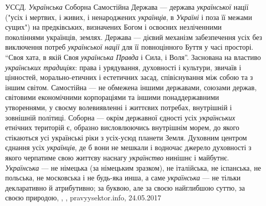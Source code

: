 УССД. \emph{Українська} Соборна Самостійна Держава — держава \emph{української} нації ("усіх
і мертвих, і живих, і ненароджених \emph{українців}, в \emph{Україні} і поза її межами
сущих") на предківських, визначених Богом і освоєних незліченними поколіннями
українців, землях.  Держава — дієвий механізм забезпечення усіх без виключення
потреб \emph{української нації} для її повноцінного Буття у часі просторі. \enquote{Своя хата,
в якій Своя \emph{українська Правда} і Сила, і Воля}. Заснована на властиво
\emph{українських традиціях}: права і урядування, духовності і культури, звичаїв і
цінностей, морально-етичних і естетичних засад, співіснування між собою та з
іншим світом.  Самостійна — не обмежена іншими державами, союзами держав,
світовими економічними корпораціями та іншими понаддержавними утвореннями, у
своєму волевиявленні і життєвих потребах, внутрішній і зовнішній політиці.
Соборна — окрім державної єдності усіх \emph{українських} етнічних територій є,
образно висловлюючись внутрішнім морем, до якого стікаються усі українські ріки
з усіх-усюд планети Земля. Духовним центром єднання усіх \emph{українців}, де б вони
не мешкали і водночас джерело духовності з якого черпатиме свою життєву наснагу
\emph{українство} нинішнє і майбутнє.  \emph{Українська} — не німецька (за німецьким
зразком), не італійська, не іспанська, не польська, не московська і не будь-яка
инша, а саме \emph{українська} — не тільки декларативно й атрибутивно; за буквою, але
за своєю найглибшою суттю, за своєю природою,
, , pravyysektor.info, 24.05.2017

